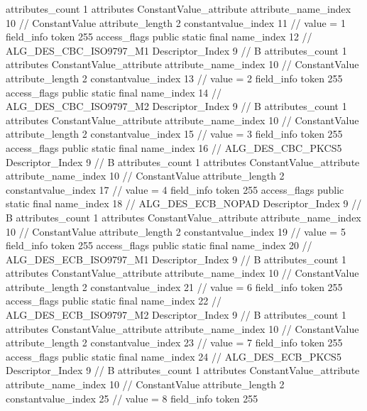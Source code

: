 {{{{{				attributes_count	1
				attributes {
				ConstantValue_attribute {
					attribute_name_index	10		// ConstantValue
					attribute_length	2
					constantvalue_index	11		// value = 1
				}
				}
			}
			field_info {
				token	255
				access_flags	public static final
				name_index	12		// ALG_DES_CBC_ISO9797_M1
				Descriptor_Index	9		// B
				attributes_count	1
				attributes {
				ConstantValue_attribute {
					attribute_name_index	10		// ConstantValue
					attribute_length	2
					constantvalue_index	13		// value = 2
				}
				}
			}
			field_info {
				token	255
				access_flags	public static final
				name_index	14		// ALG_DES_CBC_ISO9797_M2
				Descriptor_Index	9		// B
				attributes_count	1
				attributes {
				ConstantValue_attribute {
					attribute_name_index	10		// ConstantValue
					attribute_length	2
					constantvalue_index	15		// value = 3
				}
				}
			}
			field_info {
				token	255
				access_flags	public static final
				name_index	16		// ALG_DES_CBC_PKCS5
				Descriptor_Index	9		// B
				attributes_count	1
				attributes {
				ConstantValue_attribute {
					attribute_name_index	10		// ConstantValue
					attribute_length	2
					constantvalue_index	17		// value = 4
				}
				}
			}
			field_info {
				token	255
				access_flags	public static final
				name_index	18		// ALG_DES_ECB_NOPAD
				Descriptor_Index	9		// B
				attributes_count	1
				attributes {
				ConstantValue_attribute {
					attribute_name_index	10		// ConstantValue
					attribute_length	2
					constantvalue_index	19		// value = 5
				}
				}
			}
			field_info {
				token	255
				access_flags	public static final
				name_index	20		// ALG_DES_ECB_ISO9797_M1
				Descriptor_Index	9		// B
				attributes_count	1
				attributes {
				ConstantValue_attribute {
					attribute_name_index	10		// ConstantValue
					attribute_length	2
					constantvalue_index	21		// value = 6
				}
				}
			}
			field_info {
				token	255
				access_flags	public static final
				name_index	22		// ALG_DES_ECB_ISO9797_M2
				Descriptor_Index	9		// B
				attributes_count	1
				attributes {
				ConstantValue_attribute {
					attribute_name_index	10		// ConstantValue
					attribute_length	2
					constantvalue_index	23		// value = 7
				}
				}
			}
			field_info {
				token	255
				access_flags	public static final
				name_index	24		// ALG_DES_ECB_PKCS5
				Descriptor_Index	9		// B
				attributes_count	1
				attributes {
				ConstantValue_attribute {
					attribute_name_index	10		// ConstantValue
					attribute_length	2
					constantvalue_index	25		// value = 8
				}
				}
			}
			field_info {
				token	255
}}}}}
